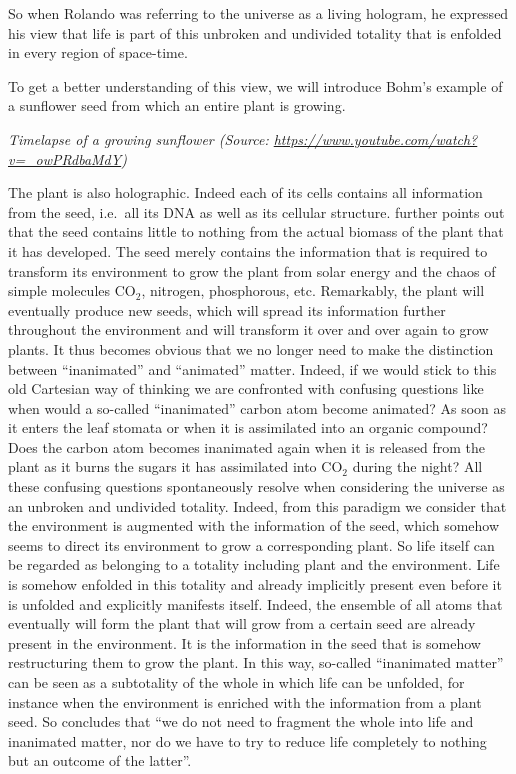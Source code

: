 \documentclass[
  11pt,
]{book}
\begin{document}
So when Rolando was referring to the universe as a living hologram, he expressed his view that life is part of this unbroken and undivided totality that is enfolded in every region of space-time.

To get a better understanding of this view, we will introduce Bohm's example of a sunflower seed from which an entire plant is growing.

\emph{Timelapse of a growing sunflower (Source: \url{https://www.youtube.com/watch?v=_owPRdbaMdY})}

The plant is also holographic. Indeed each of its cells contains all information from the seed, i.e.~all its DNA as well as its cellular structure. \citet{bohm1980} further points out that the seed contains little to nothing from the actual biomass of the plant that it has developed. The seed merely contains the information that is required to transform its environment to grow the plant from solar energy and the chaos of simple molecules CO\(_2\), nitrogen, phosphorous, etc. Remarkably, the plant will eventually produce new seeds, which will spread its information further throughout the environment and will transform it over and over again to grow plants. It thus becomes obvious that we no longer need to make the distinction between ``inanimated'' and ``animated'' matter. Indeed, if we would stick to this old Cartesian way of thinking we are confronted with confusing questions like when would a so-called ``inanimated'' carbon atom become animated? As soon as it enters the leaf stomata or when it is assimilated into an organic compound? Does the carbon atom becomes inanimated again when it is released from the plant as it burns the sugars it has assimilated into CO\(_2\) during the night? All these confusing questions spontaneously resolve when considering the universe as an unbroken and undivided totality. Indeed, from this paradigm we consider that the environment is augmented with the information of the seed, which somehow seems to direct its environment to grow a corresponding plant. So life itself can be regarded as belonging to a totality including plant and the environment. Life is somehow enfolded in this totality and already implicitly present even before it is unfolded and explicitly manifests itself. Indeed, the ensemble of all atoms that eventually will form the plant that will grow from a certain seed are already present in the environment. It is the information in the seed that is somehow restructuring them to grow the plant. In this way, so-called ``inanimated matter'' can be seen as a subtotality of the whole in which life can be unfolded, for instance when the environment is enriched with the information from a plant seed. So \citet{bohm1980} concludes that ``we do not need to fragment the whole into life and inanimated matter, nor do we have to try to reduce life completely to nothing but an outcome of the latter''.
\end{document}
